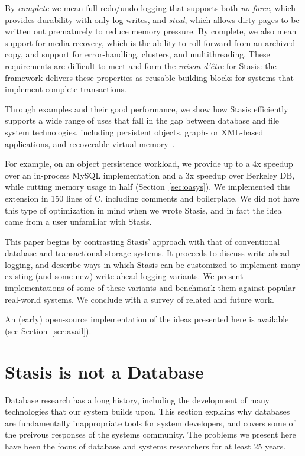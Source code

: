 \documentclass[letterpaper,twocolumn,10pt]{article}
\newcommand{\yad}{Stasis\xspace}
\newcommand{\yads}{Stasis'\xspace}
\begin{document}
By {\em complete} we mean full redo/undo logging that supports
both {\em no force}, which provides durability with only log writes,
and {\em steal}, which allows dirty pages to be written out prematurely
to reduce memory pressure. By complete, we also
mean support for media recovery, which is the ability to roll
forward from an archived copy, and support for error-handling,
clusters, and multithreading. These requirements are difficult
to meet and form the {\em raison d'\^etre} for \yad{}: the framework
delivers these properties as reusable building blocks for systems
that implement complete transactions.

Through examples and their good performance, we show how \yad{}
efficiently supports a wide range of uses that fall in the gap between 
database and file system technologies, including
persistent objects, graph- or XML-based applications, and recoverable
virtual memory~\cite{lrvm}.  

For example, on an object persistence workload, we provide up to 
a 4x speedup over an in-process MySQL implementation and a 3x speedup over Berkeley DB, while 
cutting memory usage in half (Section~\ref{sec:oasys}). 
We implemented this extension in 150 lines of C, including comments and boilerplate.  We did not have this type of optimization
in mind when we wrote \yad, and in fact the idea came from a
user unfamiliar with \yad.


This paper begins by contrasting \yads approach with that of
conventional database and transactional storage systems.  It proceeds
to discuss write-ahead logging, and describe ways in which \yad can be
customized to implement many existing (and some new) write-ahead
logging variants.  We present implementations of some of these variants and
benchmark them against popular real-world systems.  We
conclude with a survey of related and future work.

An (early) open-source implementation of
the ideas presented here is available (see Section~\ref{sec:avail}).

\section{\yad is not a Database}
\label{sec:notDB}

Database research has a long history, including the development of
many technologies that our system builds upon.  This section explains
why databases are fundamentally inappropriate tools for system
developers, and covers some of the preivous responses of the systems
community.  The problems we present here have been the focus of
database and systems researchers for at least 25 years.
\end{document}
